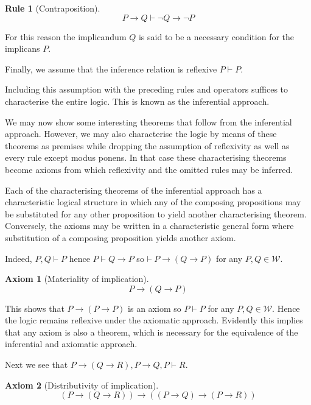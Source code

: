 \documentclass{amsbook}
\newcommand{\infers}{\mathrel\vdash}
\newcommand{\theorem}{\mathord\vdash\medspace}
\newcommand{\then}{\mathrel\rightarrow}
\theoremstyle{definition}
\newtheorem{axm}{Axiom}[section]
\newtheorem{frule}{Rule}[section]
\begin{document}
\begin{frule}[Contraposition]
    $$P \then Q \infers \neg Q \then \neg P$$
\end{frule}

For this reason the implicandum $Q$ is said to be a necessary condition for the implicans $P$.

Finally, we assume that the inference relation is reflexive $P \infers P$.

Including this assumption with the preceding rules and operators suffices to characterise the entire logic. This is known as the inferential approach.


We may now show some interesting theorems that follow from the inferential approach. However, we may also characterise the logic by means of these theorems as premises while dropping the assumption of reflexivity as well as every rule except modus ponens. In that case these characterising theorems become axioms from which reflexivity and the omitted rules may be inferred.

Each of the characterising theorems of the inferential approach has a characteristic logical structure in which any of the composing propositions may be substituted for any other proposition to yield another characterising theorem. Conversely, the axioms may be written in a characteristic general form where substitution of a composing proposition yields another axiom.

Indeed, $P, Q \infers P$ hence $P \infers Q \then P$ so $\theorem P \then (Q \then P)$ for any $P, Q \in \mathcal W$.

\begin{axm}[Materiality of implication]
    $$P \then (Q \then P)$$
\end{axm}

This shows that $P \then (P \then P)$ is an axiom so $P \infers P$ for any $P, Q \in \mathcal W$. Hence the logic remains reflexive under the axiomatic approach. Evidently this implies that any axiom is also a theorem, which is necessary for the equivalence of the inferential and axiomatic approach.

Next we see that $P \then (Q \then R), P \then Q, P \infers R$.

\begin{axm}[Distributivity of implication]
    $$(P \then (Q \then R)) \then ((P \then Q) \then (P \then R))$$
\end{axm}
\end{document}
